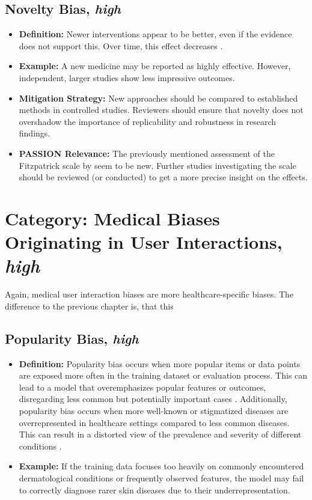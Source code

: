 \documentclass[12pt, a4paper, oneside]{book}   	%
\begin{document}
\begin{appendices}
		\subsection{Novelty Bias, \textit{high}}
		\begin{itemize}
			\item \textbf{Definition:} Newer interventions appear to be better, even if the evidence does not support this. Over time, this effect decreases \autocite{Chakraborty_2024}.
			\item \textbf{Example:} A new medicine may be reported as highly effective. However, independent, larger studies show less impressive outcomes.
			\item \textbf{Mitigation Strategy:} New approaches should be compared to established methods in controlled studies. Reviewers should ensure that novelty does not overshadow the importance of replicability and robustness in research findings.
			\item \textbf{PASSION Relevance:} The previously mentioned assessment of the Fitzpatrick scale by \autocite{Montoya_2025} seem to be new. Further studies investigating the scale should be reviewed (or conducted) to get a more precise insight on the effects.
		\end{itemize}
		
		\section{Category: Medical Biases Originating in User Interactions, \textit{high}} \label{app:biasCategoriesMedicalBiasesUserInteractionsHigh}
		Again, medical user interaction biases are more healthcare-specific biases. The difference to the previous chapter is, that this
		
		\subsection{Popularity Bias, \textit{high}} \label{app:biasPopularity}
		\begin{itemize}
			\item \textbf{Definition:} Popularity bias occurs when more popular items or data points are exposed more often in the training dataset or evaluation process. This can lead to a model that overemphasizes popular features or outcomes, disregarding less common but potentially important cases \autocite{M117_Ciampaglia_2018,Mehrabi_2021}.
			Additionally, popularity bias occurs when more well-known or stigmatized diseases are overrepresented in healthcare settings compared to less common diseases. This can result in a distorted view of the prevalence and severity of different conditions \autocite{Chakraborty_2024}.
			\item \textbf{Example:} If the training data focuses too heavily on commonly encountered dermatological conditions or frequently observed features, the model may fail to correctly diagnose rarer skin diseases due to their underrepresentation.
			

\end{itemize}
\end{appendices}
\end{document}

